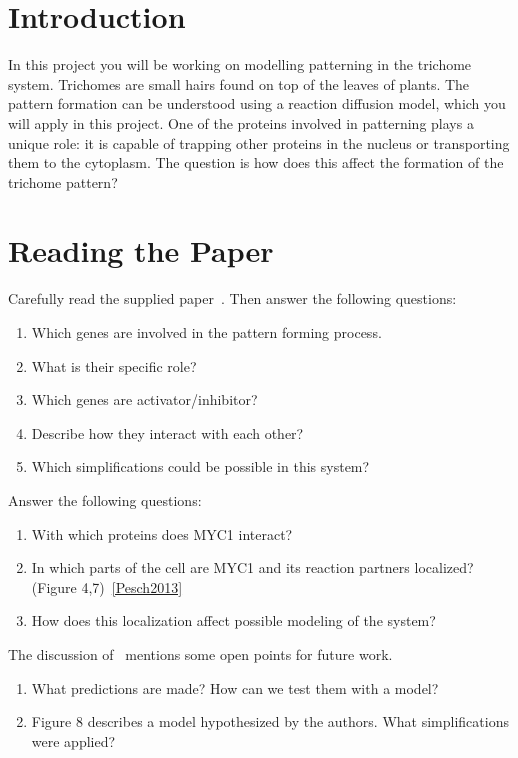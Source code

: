 \section{Introduction}
In this project you will be working on modelling patterning in the trichome system.
Trichomes are small hairs found on top of the leaves of plants.
The pattern formation can be understood using a reaction diffusion model, which you will apply in this project.
One of the proteins involved in patterning plays a unique role: it is capable of trapping other proteins in the nucleus or transporting them to the cytoplasm.
The question is how does this affect the formation of the trichome pattern?
%
%
\section{Reading the Paper}
Carefully read the supplied paper~\cite{Pesch2013}.
Then answer the following questions:
\begin{enumerate}
    \item Which genes are involved in the pattern forming process.
    \item What is their specific role?
    \item Which genes are activator/inhibitor?
    \item Describe how they interact with each other?
    \item Which simplifications could be possible in this system?
\end{enumerate}
%
%
Answer the following questions:
\begin{enumerate}
    \item With which proteins does MYC1 interact?
    \item In which parts of the cell are MYC1 and its reaction partners localized? (Figure 4,7)~\ref{Pesch2013}
    \item How does this localization affect possible modeling of the system?
\end{enumerate}
%
%
The discussion of~\cite{Pesch2013} mentions some open points for future work.
\begin{enumerate}
    \item What predictions are made?
    How can we test them with a model?
    \item Figure 8 describes a model hypothesized by the authors.
    What simplifications were applied?
\end{enumerate}
%
%
